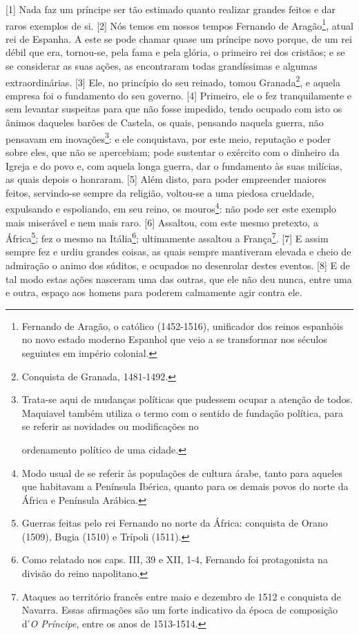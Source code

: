 {[}1{]} Nada faz um príncipe ser tão estimado quanto realizar grandes
feitos e dar raros exemplos de si. {[}2{]} Nós temos em nossos tempos
Fernando de Aragão\footnote{Fernando de Aragão, o católico (1452-1516),
  unificador dos reinos espanhóis no novo estado moderno Espanhol que
  veio a se transformar nos séculos seguintes em império colonial.},
atual rei de Espanha. A este se pode chamar quase um príncipe novo
porque, de um rei débil que era, tornou-se, pela fama e pela glória, o
primeiro rei dos cristãos; e se se considerar as suas ações, as
encontraram todas grandíssimas e algumas extraordinárias. {[}3{]} Ele,
no princípio do seu reinado, tomou Granada\footnote{Conquista de
  Granada, 1481-1492.}, e aquela empresa foi o fundamento do seu
governo. {[}4{]} Primeiro, ele o fez tranquilamente e sem levantar
suspeitas para que não fosse impedido, tendo ocupado com isto os ânimos
daqueles barões de Castela, os quais, pensando naquela guerra, não
pensavam em inovações\footnote{Trata-se aqui de mudanças políticas que
  pudessem ocupar a atenção de todos. Maquiavel também utiliza o termo
  com o sentido de fundação política, para se referir as novidades ou
  modificações no

  ordenamento político de uma cidade.}: e ele conquistava, por este
meio, reputação e poder sobre eles, que não se apercebiam; pode
sustentar o exército com o dinheiro da Igreja e do povo e, com aquela
longa guerra, dar o fundamento às suas milícias, as quais depois o
honraram. {[}5{]} Além disto, para poder empreender maiores feitos,
servindo-se sempre da religião, voltou-se a uma piedosa crueldade,
expulsando e espoliando, em seu reino, os mouros\footnote{Modo usual de
  se referir às populações de cultura árabe, tanto para aqueles que
  habitavam a Península Ibérica, quanto para os demais povos do norte da
  África e Península Arábica.}: não pode ser este exemplo mais miserável
e nem mais raro. {[}6{]} Assaltou, com este mesmo pretexto, a
África\footnote{Guerras feitas pelo rei Fernando no norte da África:
  conquista de Orano (1509), Bugia (1510) e Trípoli (1511).}; fez o
mesmo na Itália\footnote{Como relatado nos caps. III, 39 e XII, 1-4,
  Fernando foi protagonista na divisão do reino napolitano.};
ultimamente assaltou a França\footnote{Ataques ao território francês
  entre maio e dezembro de 1512 e conquista de Navarra. Essas afirmações
  são um forte indicativo da época de composição d'\emph{O Príncipe},
  entre os anos de 1513-1514.}. {[}7{]} E assim sempre fez e urdiu
grandes coisas, as quais sempre mantiveram elevada e cheio de admiração
o animo dos súditos, e ocupados no desenrolar destes eventos. {[}8{]} E
de tal modo estas ações nasceram uma das outras, que ele não deu nunca,
entre uma e outra, espaço aos homens para poderem calmamente agir contra
ele.

